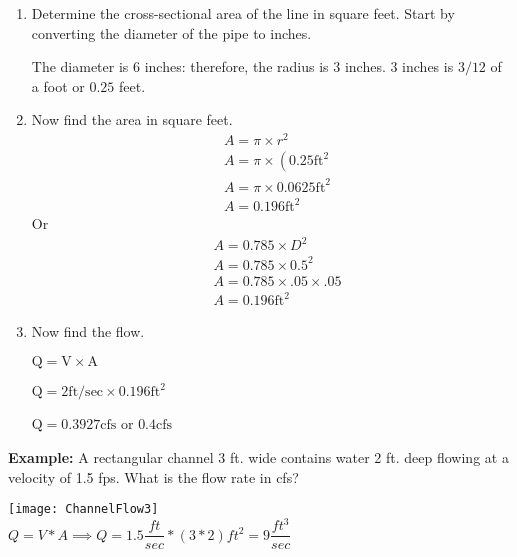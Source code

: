 \begin{enumerate}
\item Determine the cross-sectional area of the line in square feet. Start by converting the diameter of the pipe to inches.

The diameter is 6 inches: therefore, the radius is 3 inches. 3 inches is $3 / 12$ of a foot or $0.25$ feet.

\item Now find the area in square feet.
$$
\begin{aligned}
&A=\pi \times r^{2} \\
&A=\pi \times\left(0.25 \mathrm{ft}^{2}\right. \\
&A=\pi \times 0.0625 \mathrm{ft}^{2} \\
&A=0.196 \mathrm{ft}^{2}
\end{aligned}
$$
Or
$$
\begin{aligned}
&A=0.785 \times D^{2} \\
&A=0.785 \times 0.5^{2} \\
&A=0.785 \times .05 \times .05 \\
&A=0.196 \mathrm{ft}^{2}
\end{aligned}
$$

\item Now find the flow.

$\mathrm{Q}=\mathrm{V} \times \mathrm{A}$

$\mathrm{Q}=2 \mathrm{ft} / \mathrm{sec} \times 0.196 \mathrm{ft}^{2}$

$\mathrm{Q}=0.3927 \mathrm{cfs}$ or $0.4 \mathrm{cfs}$

\end{enumerate}


\textbf{Example:} A rectangular channel 3 ft. wide contains water 2 ft. deep flowing at a velocity of 1.5 fps.
What is the flow rate in cfs?

\texttt{[image: ChannelFlow3]}\\
$Q=V*A \implies Q = 1.5 \dfrac{ft}{sec}*(3*2)ft^2=\boxed{9\dfrac{ft^3}{sec}}$

